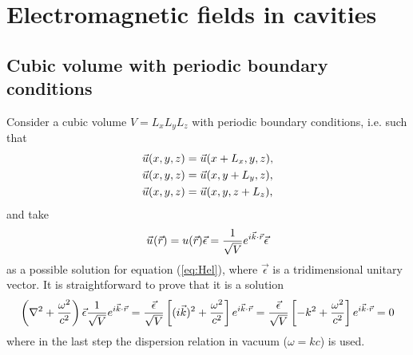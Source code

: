 \section{Electromagnetic fields in cavities}

\subsection{Cubic volume with periodic boundary conditions}
Consider a cubic volume $V=L_x L_y L_z$ with periodic boundary conditions, i.e. such that
\begin{align}
    \vec{u}(x, y, z) &= \vec{u}(x+L_x, y, z), \\
    \vec{u}(x, y, z) &= \vec{u}(x, y+L_y, z), \\
    \vec{u}(x, y, z) &= \vec{u}(x, y, z+L_z),
\end{align}
and take
\begin{align}
    \vec{u}_{}(\vec{r})= u(\vec{r}) \vec{\epsilon} =  \frac{1}{\sqrt{V}}  e^{i \vec{k} \cdot \vec{r}} \vec{\epsilon}
\end{align}
as a possible solution for equation (\ref{eq:Hel}), where $\vec{\epsilon}$ is a tridimensional unitary vector. It is straightforward to prove that it is a solution 
\begin{align*}
    \left( \nabla^2  + \frac{\omega^2}{c^2} \right)\vec{\epsilon} \frac{1}{\sqrt{V}}  e^{i \vec{k} \cdot \vec{r}} = 
    \frac{\vec{\epsilon}}{\sqrt{V}} \left[ (i \vec{k})^2 + \frac{\omega^2}{c^2} \right] e^{i \vec{k} \cdot \vec{r}} = 
    \frac{\vec{\epsilon}}{\sqrt{V}} \left[ -k^2 + \frac{\omega^2}{c^2} \right] e^{i \vec{k} \cdot \vec{r}} = 0
\end{align*}
where in the last step the dispersion relation in vacuum ($\omega = k c$) is used.  \\
 
